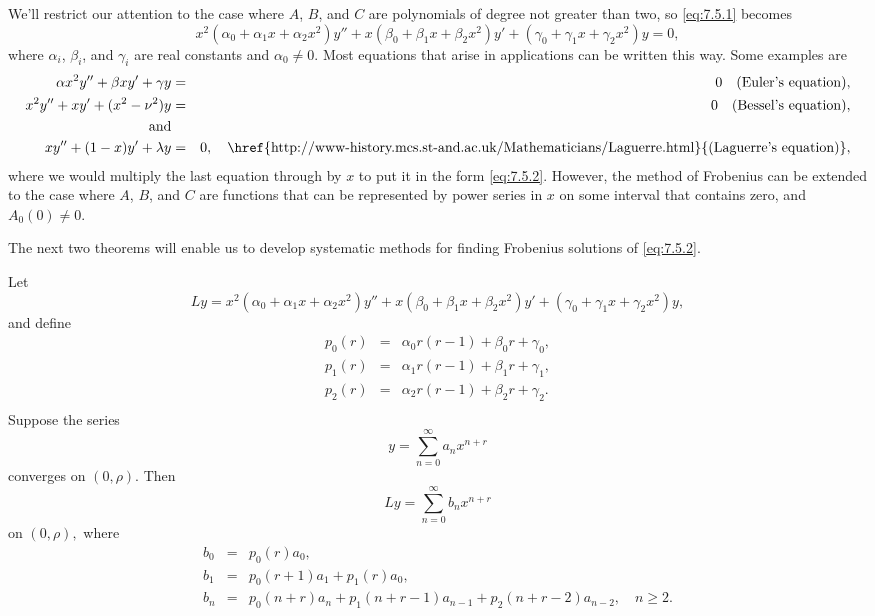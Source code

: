 \documentclass{ximera}
\begin{document}
We'll restrict our attention to the case where $A$, $B$, and $C$ are
polynomials of degree not greater than two, so \eqref{eq:7.5.1} becomes
\begin{equation} \label{eq:7.5.2}
x^2(\alpha_0+\alpha_1x+\alpha_2x^2)y''+x(\beta_0+\beta_1x+\beta_2x^2)y'
+(\gamma_0+\gamma_1x+\gamma_2x^2)y=0,
\end{equation}
where $\alpha_i$, $\beta_i$, and $\gamma_i$ are real constants and
$\alpha_0\neq 0$. Most  equations that arise in
applications can be written this way. Some examples are
\begin{eqnarray*}
\alpha x^2y''+\beta xy'+\gamma y&=&0 \quad\mbox{(Euler's equation)},
\\
x^2y''+xy'+(x^2-\nu^2)y&=&0 \quad\mbox{(Bessel's equation)},\\
\mbox{and}\\
xy''+(1-x)y'+\lambda y&=&0,
\quad\mbox{\href{http://www-history.mcs.st-and.ac.uk/Mathematicians/Laguerre.html}{(Laguerre's equation)}},
\end{eqnarray*}
where we would multiply the last equation through by $x$ to put it in
the form \eqref{eq:7.5.2}. However, the method of Frobenius can be
extended to the case where $A$, $B$, and $C$ are functions that can be
represented by power series in $x$ on some interval that contains zero,
and $A_0(0)\neq 0$.

The next two theorems will enable us to develop systematic methods for
finding Frobenius solutions of \eqref{eq:7.5.2}.

\begin{theorem}\label{thmtype:7.5.1}
Let
$$
Ly=
x^2(\alpha_0+\alpha_1x+\alpha_2x^2)y''+x(\beta_0+\beta_1x+\beta_2x^2)y'
+(\gamma_0+\gamma_1x+\gamma_2x^2)y,
$$
and define
\begin{eqnarray*}
p_0(r)&=&\alpha_0r(r-1)+\beta_0r+\gamma_0,\\
p_1(r)&=&\alpha_1r(r-1)+\beta_1r+\gamma_1,\\
p_2(r)&=&\alpha_2r(r-1)+\beta_2r+\gamma_2.\\
\end{eqnarray*}
Suppose the series
\begin{equation} \label{eq:7.5.3}
y=\sum_{n=0}^\infty a_nx^{n+r}
\end{equation}
converges on $(0,\rho)$.
 Then
\begin{equation} \label{eq:7.5.4}
Ly=\sum_{n=0}^\infty b_nx^{n+r}
\end{equation}
on $(0,\rho),$
where
\begin{equation} \label{eq:7.5.5}
\begin{array}{ccl}
b_0&=&p_0(r)a_0,\\
b_1&=&p_0(r+1)a_1+p_1(r)a_0,\\
b_n&=&p_0(n+r)a_n+p_1(n+r-1)a_{n-1}+p_2(n+r-2)a_{n-2},\quad n\geq2.
\end{array}
\end{equation}
\end{theorem}
\end{document}
